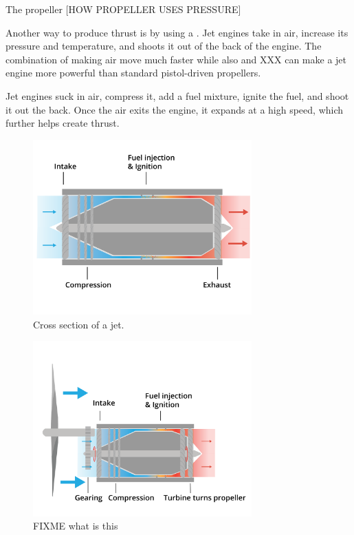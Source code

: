 
The propeller [HOW PROPELLER USES PRESSURE]

Another way to produce thrust is by using a . Jet engines take in air, increase its pressure and temperature, and shoots it out of the back of the engine. The combination of making air move much faster while also 
and XXX can make a jet engine more powerful than standard pistol-driven propellers. 


Jet engines suck in air, compress it, add a fuel mixture, ignite the fuel, and shoot it out the back. Once the air exits the engine, it expands at a high speed, which further helps create thrust. 




\begin{figure}[htbp]
    \centering
    \includegraphics[width=0.75\textwidth]{jet.png}
    \caption{Cross section of a jet.}
    \label{fig:jet}
\end{figure}
    

\begin{figure}[htbp]
    \centering
    \includegraphics[width=0.75\textwidth]{turboProp.png}
    \caption{FIXME what is this}
    \label{fig:turboProp}
\end{figure}


